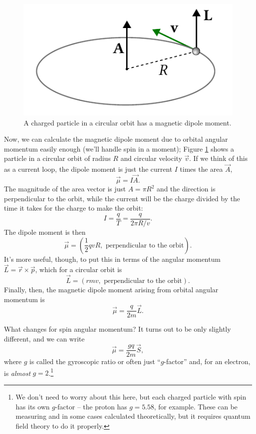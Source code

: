\begin{figure}
\centering\includegraphics[width=0.5\linewidth]{Figures/Chapter 1/fig_circular_orbit.pdf}
\caption{A charged particle in a circular orbit has a magnetic dipole moment.}
\label{fig_circular_orbit}
\end{figure}

Now, we can calculate the magnetic dipole moment due to orbital angular momentum easily enough (we'll handle spin in a moment); Figure \ref{fig_circular_orbit} shows a particle in a circular orbit of radius $R$ and circular velocity $\vec{v}$.  If we think of this as a current loop, the dipole moment is just the current $I$ times the area $\vec{A}$,
\[
\vec{\mu} = I\vec{A}.
\]
The magnitude of the area vector is just $A = \pi R^2$ and the direction is perpendicular to the orbit, while the current will be the charge divided by the time it takes for the charge to make the orbit:
\[
I = \frac{q}{T} = \frac{q}{2\pi R / v}.
\]
The dipole moment is then
\[
\vec{\mu} = \left( \frac{1}{2} qvR, \text{ perpendicular to the orbit} \right).
\]
It's more useful, though, to put this in terms of the angular momentum $\vec{L} = \vec{r} \times \vec{p}$, which for a circular orbit is
\[
\vec{L} = \left( rmv, \text{ perpendicular to the orbit} \right).
\]
Finally, then, the magnetic dipole moment arising from orbital angular momentum is 
\begin{equation}
\vec{\mu} = \frac{q}{2m} \vec{L}.
\end{equation}

What changes for spin angular momentum?  It turns out to be only slightly different, and we can write
\begin{equation}
\vec{\mu} = \frac{gq}{2m} \vec{S},
\end{equation}
where $g$ is called the gyroscopic ratio or often just ``$g$-factor'' and, for an electron, is \emph{almost} $g = 2$.\footnote{We don't need to worry about this here, but each charged particle with spin has its own $g$-factor -- the proton has $g = 5.58$, for example.  These can be measuring and in some cases calculated theoretically, but it requires quantum field theory to do it properly.}

